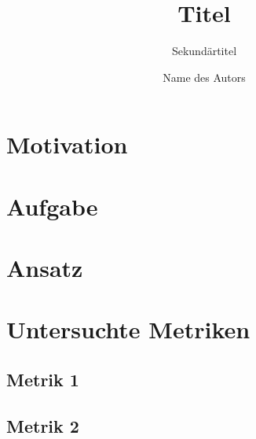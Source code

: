 \documentclass[fontsize=11pt,%
               paper=a4,%
               headings=small,
               DIV=15]{scrartcl}
\title{Titel}
\subtitle{Sekundärtitel}
\author{Name des Autors}
\begin{document}
\maketitle

\section*{Motivation}
\blindtext
\cite{rfc1337}

\section*{Aufgabe}
\blindtext

\section*{Ansatz}
\blindtext

\section*{Untersuchte Metriken}
\blindtext

\subsection*{Metrik 1}
\blindtext

\subsection*{Metrik 2}
\blindtext





\end{document}
